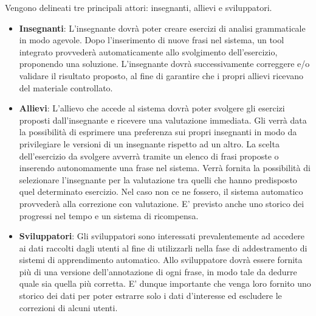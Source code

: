 	Vengono delineati tre principali attori: insegnanti, allievi e sviluppatori.
\begin{itemize}
	\item \textbf{Insegnanti}:
	L'insegnante dovrà poter creare esercizi di analisi grammaticale in modo agevole. Dopo l'inserimento di nuove frasi nel sistema, un tool integrato provvederà automaticamente allo svolgimento dell'esercizio, proponendo una soluzione. L'insegnante dovrà successivamente correggere e/o validare il risultato proposto, al fine di garantire che i propri allievi ricevano del materiale controllato.
	\item \textbf{Allievi}:
	L'allievo che accede al sistema dovrà poter svolgere gli esercizi proposti dall'insegnante e ricevere una valutazione immediata. Gli verrà data la possibilità di esprimere una preferenza sui propri insegnanti in modo da privilegiare le versioni di un insegnante rispetto ad un altro. La scelta dell'esercizio da svolgere avverrà tramite un elenco di frasi proposte o inserendo autonomamente una frase nel sistema. Verrà fornita la possibilità di selezionare l'insegnante per la valutazione tra quelli che hanno predisposto quel determinato esercizio. Nel caso non ce ne fossero, il sistema automatico provvederà alla correzione con valutazione. E' previsto anche uno storico dei progressi nel tempo e un sistema di ricompensa.
	\item \textbf{Sviluppatori}:
	Gli sviluppatori sono interessati prevalentemente ad accedere ai dati raccolti dagli utenti al fine di utilizzarli nella fase di addestramento di sistemi di apprendimento automatico. Allo sviluppatore dovrà essere fornita più di una versione dell’annotazione di ogni frase, in modo tale da dedurre quale sia quella più corretta. E' dunque importante che venga loro fornito uno storico dei dati per poter estrarre solo i dati d'interesse ed escludere le correzioni di alcuni utenti. 
\end{itemize}
